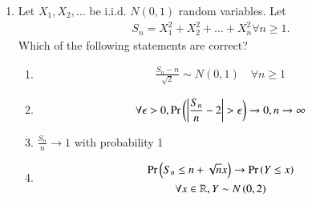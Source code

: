 \begin{enumerate}[label=\thesection.\arabic*.,ref=\thesection.\theenumi]
\item Let $X_1,X_2, \dots$ be i.i.d. $N(0,1)$ random variables. Let 
\begin{align}
S_{n}=X_{1}^2+X_{2}^2+\dots+X_{n}^2 \forall n \geq 1. 
\end{align}
Which of the following statements are correct?
%
\begin{enumerate}
\setlength\itemsep{1em}
\item 
\begin{align}
    \frac{S_{n}-n}{\sqrt{2}}\sim N(0,1) \quad  \forall n\geq 1
\end{align}
\item 
\begin{align}
    \forall \epsilon > 0,\Pr\left(\left\vert\frac{S_n}{n}-2\right\vert>\epsilon\right)\to 0, n \to \infty
\end{align}

\item $\frac{S_{n}}{n} \to 1$ with probability 1
\item 
\begin{multline}
    \Pr\left({S_{n} \leq n+\sqrt{n}x}\right) \to \Pr\left({Y \leq x}\right)
    \\
    \forall x\in \mathbb{R}, Y \sim N\left(0,2\right)
\end{multline}
%
\end{enumerate}
%
\solution



\end{enumerate}
